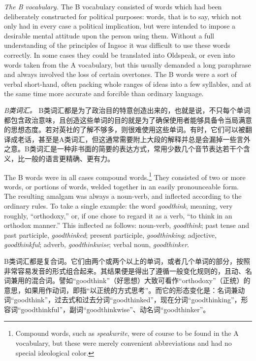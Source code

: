 \begin{paracol}{2}
\emph{The B vocabulary.} The B vocabulary consisted of words which had
been deliberately constructed for political purposes: words, that is to
say, which not only had in every case a political implication, but were
intended to impose a desirable mental attitude upon the person using
them. Without a full understanding of the principles of Ingsoc it was
difficult to use these words correctly. In some cases they could be
translated into Oldspeak, or even into words taken from the A
vocabulary, but this usually demanded a long paraphrase and always
involved the loss of certain overtones. The B words were a sort of
verbal short-hand, often packing whole ranges of ideas into a few
syllables, and at the same time more accurate and forcible than ordinary
language.

\switchcolumn

\emph{B类词汇。} B类词汇都是为了政治目的特意创造出来的，也就是说，不只每个单词都包含政治意味，且创造这些单词的目的就是为了确保使用者能够具备令当局满意的思想态度。若对英社的了解不够多，则很难使用这些单词。有时，它们可以被翻译成老话，甚至是A类词汇，但这通常需要附上大段的解释并总是会漏掉一些言外之意。B类词汇是一种非书面的简要的表达方式，常用少数几个音节表达若干个含义，比一般的语言更精确、更有力。

\switchcolumn*

The B words were in all cases compound words.\footnote{Compound words, such
  as \emph{speakwrite}, were of course to be found in the A vocabulary, but
  these were merely convenient abbreviations and had no special ideological
  color.} They consisted of two or more words, or portions of words, welded
together in an easily pronounceable form. The resulting amalgam was always a
noun-verb, and inflected according to the ordinary rules. To take a single
example: the word \emph{goodthink}, meaning, very roughly, ``orthodoxy,''
or, if one chose to regard it as a verb, ``to think in an orthodox manner.''
This inflected as follows: noun-verb, \emph{goodthink}; past tense and past
participle, \emph{goodthinked}; present participle, \emph{goodthinking};
adjective, \emph{goodthinkful}; adverb, \emph{goodthinkwise}; verbal noun,
\emph{goodthinker}.

\switchcolumn

B类词汇都是复合词。它们由两个或两个以上的单词，或者几个单词的部分，按照非常容易发音的形式组合起来。其结果便是得出了遵循一般变化规则的，且动、名词兼用的混合词。譬如``goodthink''（好思想）大致可看作``orthodoxy''（正统）的意思，如果用作动词，即指``以正统的方式思考''。而它的形态变化是：名词兼动词``goodthink''，过去式和过去分词``goodthinked''，现在分词``goodthinking''，形容词``goodthinkful''，副词``goodthinkwise''、动名词``goodthinker''。


\end{paracol}

